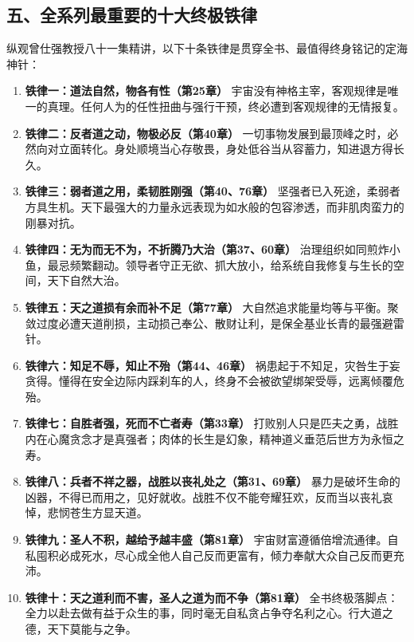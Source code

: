 \clearpage

\subsection*{五、全系列最重要的十大终极铁律}

纵观曾仕强教授八十一集精讲，以下十条铁律是贯穿全书、最值得终身铭记的定海神针：

\begin{enumerate}
    \item \textbf{铁律一：道法自然，物各有性（第25章）}
    宇宙没有神格主宰，客观规律是唯一的真理。任何人为的任性扭曲与强行干预，终必遭到客观规律的无情报复。
    
    \item \textbf{铁律二：反者道之动，物极必反（第40章）}
    一切事物发展到最顶峰之时，必然向对立面转化。身处顺境当心存敬畏，身处低谷当从容蓄力，知进退方得长久。
    
    \item \textbf{铁律三：弱者道之用，柔韧胜刚强（第40、76章）}
    坚强者已入死途，柔弱者方具生机。天下最强大的力量永远表现为如水般的包容渗透，而非肌肉蛮力的刚暴对抗。
    
    \item \textbf{铁律四：无为而无不为，不折腾乃大治（第37、60章）}
    治理组织如同煎炸小鱼，最忌频繁翻动。领导者守正无欲、抓大放小，给系统自我修复与生长的空间，天下自然大治。
    
    \item \textbf{铁律五：天之道损有余而补不足（第77章）}
    大自然追求能量均等与平衡。聚敛过度必遭天道削损，主动损己奉公、散财让利，是保全基业长青的最强避雷针。
    
    \item \textbf{铁律六：知足不辱，知止不殆（第44、46章）}
    祸患起于不知足，灾咎生于妄贪得。懂得在安全边际内踩刹车的人，终身不会被欲望绑架受辱，远离倾覆危殆。
    
    \item \textbf{铁律七：自胜者强，死而不亡者寿（第33章）}
    打败别人只是匹夫之勇，战胜内在心魔贪念才是真强者；肉体的长生是幻象，精神道义垂范后世方为永恒之寿。
    
    \item \textbf{铁律八：兵者不祥之器，战胜以丧礼处之（第31、69章）}
    暴力是破坏生命的凶器，不得已而用之，见好就收。战胜不仅不能夸耀狂欢，反而当以丧礼哀悼，悲悯苍生方显天道。
    
    \item \textbf{铁律九：圣人不积，越给予越丰盛（第81章）}
    宇宙财富遵循倍增流通律。自私囤积必成死水，尽心成全他人自己反而更富有，倾力奉献大众自己反而更充沛。
    
    \item \textbf{铁律十：天之道利而不害，圣人之道为而不争（第81章）}
    全书终极落脚点：全力以赴去做有益于众生的事，同时毫无自私贪占争夺名利之心。行大道之德，天下莫能与之争。
\end{enumerate}

